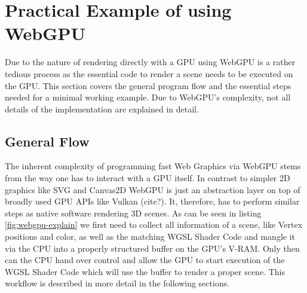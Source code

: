 %
%
% 
% 

\newcommand*{\codesnippet}[4]{
  \inputminted[
    frame=lines,
    framesep=2mm,
    baselinestretch=1.2,
    linenos,
    fontsize=\scriptsize,
    firstline=#1,
    lastline=#2
  ]{#3}{#4}}


\newcommand*{\code}[1]{
  \inputminted[
    frame=lines,
    framesep=2mm,
    baselinestretch=1.2,
    linenos,
    fontsize=\scriptsize,
    breaklines=true,
    highlightlines={30-33,42-49}
  ]{typescript}{#1}}


\chapter{Practical Example of using WebGPU}

\label{chap:PracticalExample}

Due to the nature of rendering directly with a GPU using WebGPU is a rather tedious process as the essential code to render a scene needs to be executed on the GPU.
This section covers the general program flow and the essential steps needed for a minimal working example. Due to WebGPU's complexity, not all details of the implementation are explained in detail. 


\section{General Flow}

The inherent complexity of programming fast Web Graphics via WebGPU stems from the way one has to interact with a GPU itself.
In contrast to simpler 2D graphics like SVG and Canvas2D WebGPU is just an abstraction layer on top of broadly used GPU APIs like Vulkan (cite?).
It, therefore, has to perform similar steps as native software rendering 3D scenes. As can be seen in listing \ref*{fig:webgpu-explain} we first need to
collect all information of a scene, like Vertex positions and color, as well as the matching WGSL Shader Code and mangle it via the CPU into a properly structured
buffer on the GPU's V-RAM. Only then can the CPU hand over control and allow the GPU to start execution of the WGSL Shader Code which will use the buffer to render a proper scene.
This workflow is described in more detail in the following sections.


